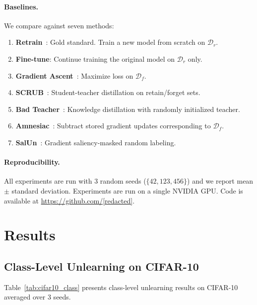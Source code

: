 \documentclass[11pt]{article}
\begin{document}
\paragraph{Baselines.}
We compare against seven methods:
\begin{enumerate}[leftmargin=*]
    \item \textbf{Retrain}~\citep{bourtoule2021machine}: Gold standard. Train a new model from scratch on $\mathcal{D}_r$.
    \item \textbf{Fine-tune}: Continue training the original model on $\mathcal{D}_r$ only.
    \item \textbf{Gradient Ascent}~\citep{thudi2022unrolling}: Maximize loss on $\mathcal{D}_f$.
    \item \textbf{SCRUB}~\citep{kurmanji2023towards}: Student-teacher distillation on retain/forget sets.
    \item \textbf{Bad Teacher}~\citep{chundawat2023can}: Knowledge distillation with randomly initialized teacher.
    \item \textbf{Amnesiac}~\citep{graves2021amnesiac}: Subtract stored gradient updates corresponding to $\mathcal{D}_f$.
    \item \textbf{SalUn}~\citep{fan2023salun}: Gradient saliency-masked random labeling.
\end{enumerate}

\paragraph{Reproducibility.}
All experiments are run with 3 random seeds ($\{42, 123, 456\}$) and we report mean $\pm$ standard deviation. Experiments are run on a single NVIDIA GPU. Code is available at \url{https://github.com/[redacted]}.

\section{Results}
\label{sec:results}

\subsection{Class-Level Unlearning on CIFAR-10}

Table~\ref{tab:cifar10_class} presents class-level unlearning results on CIFAR-10 averaged over 3 seeds.
\end{document}
